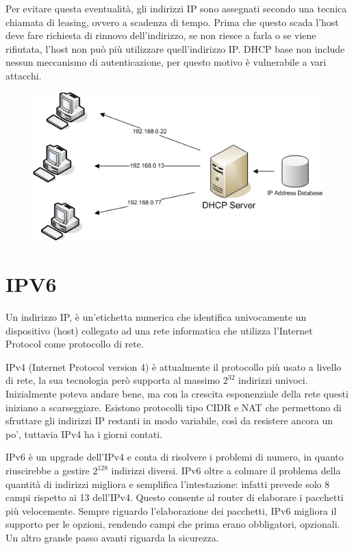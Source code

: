 Per evitare questa eventualità, gli indirizzi IP sono assegnati secondo una tecnica chiamata di leasing, ovvero a scadenza di tempo. Prima che questo scada l’host deve fare richiesta di rinnovo dell’indirizzo, se non riesce a farla o se viene rifiutata, l’host non può più utilizzare quell’indirizzo IP.
DHCP base non include nessun meccanismo di autenticazione, per questo motivo è vulnerabile a vari attacchi.

\begin{figure}[H]
\centering
\includegraphics[scale=0.6]{res/img/44_DHCP.png}
\end{figure}

\section{IPV6}

Un indirizzo IP, è un’etichetta numerica che identifica univocamente un dispositivo (host) collegato ad una rete informatica che utilizza l’Internet Protocol come protocollo di rete.

IPv4 (Internet Protocol version 4) è attualmente il protocollo più usato a livello di rete, la sua tecnologia però supporta al massimo $2^32$ indirizzi univoci.
Inizialmente poteva andare bene, ma con la crescita esponenziale della rete questi iniziano a scarseggiare. Esistono protocolli tipo CIDR e NAT che permettono di sfruttare gli indirizzi IP restanti in modo variabile, così da resistere ancora un po’, tuttavia IPv4 ha i giorni contati.

IPv6 è un upgrade dell’IPv4 e conta di risolvere i problemi di numero, in quanto riuscirebbe a gestire $2^128$ indirizzi diversi.
IPv6 oltre a colmare il problema della quantità di indirizzi migliora e semplifica l’intestazione: infatti prevede solo 8 campi rispetto ai 13 dell'IPv4. Questo consente al router di elaborare i pacchetti più velocemente. Sempre riguardo l’elaborazione dei pacchetti, IPv6 migliora il supporto per le opzioni, rendendo campi che prima erano obbligatori, opzionali. Un altro grande passo avanti riguarda la sicurezza.

